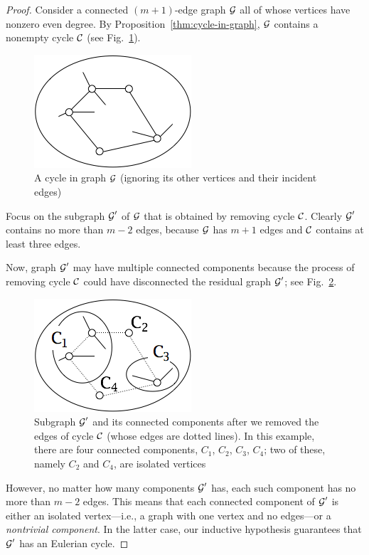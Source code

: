 \begin{proof}
Consider a connected $(m+1)$-edge graph $\mbox{$\cal G$}$ all of whose vertices have nonzero even degree.  By Proposition~\ref{thm:cycle-in-graph}, $\mbox{$\cal G$}$ contains a nonempty cycle $\mbox{$\cal C$}$ (see Fig.~\ref{fig:eulerianProof1}). 
\begin{figure}[hbt]
\begin{center}
       \includegraphics[scale=0.45]{FiguresGraph/EulerianProof1}
       \caption{A cycle in graph $\mbox{$\cal G$}$ (ignoring its other vertices and their incident edges)}
  \label{fig:eulerianProof1}
\end{center}
\end{figure}
Focus on the subgraph $\mbox{$\cal G$}'$ of $\mbox{$\cal G$}$ that is obtained by removing cycle $\mbox{$\cal C$}$.  Clearly $\mbox{$\cal G$}'$ contains no more than $m-2$ edges, because $\mbox{$\cal G$}$ has $m+1$ edges and $\mbox{$\cal C$}$ contains at least three edges.

\smallskip

Now,  graph $\mbox{$\cal G$}'$ may have multiple connected components because the process of removing cycle $\mbox{$\cal C$}$ could have disconnected the residual graph $\mbox{$\cal G$}'$; see Fig.~\ref{fig:eulerianProof2}.
\begin{figure}[hbt]
\begin{center}
       \includegraphics[scale=0.45]{FiguresGraph/EulerianProof2}
 \caption{Subgraph $\mbox{$\cal G$}'$ and its connected components after we removed the edges of cycle $\mbox{$\cal C$}$ (whose edges are dotted lines).  In this example, there are four connected components, $C_1$, $C_2$, $C_3$, $C_4$; two of these, namely $C_2$ and $C_4$, are isolated vertices}
  \label{fig:eulerianProof2}
\end{center}
\end{figure}
However, no matter how many components $\mbox{$\cal G$}'$ has, each such component has no more than $m-2$ edges.  This means that each connected component of $\mbox{$\cal G$}'$ is either an isolated vertex---i.e., a graph with one vertex and no edges---or a {\em nontrivial component}.  In the latter case, our inductive hypothesis guarantees that $\mbox{$\cal G$}'$ has an Eulerian cycle.


\end{proof}
